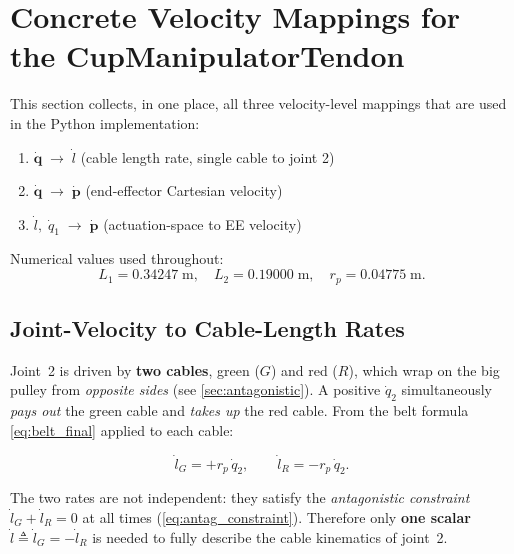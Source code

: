 \documentclass[12pt, a4paper]{article}
\theoremstyle{definition}
\newcommand{\bq}{\bm{q}}
\newcommand{\bp}{\bm{p}}
\begin{document}
\section{Concrete Velocity Mappings for the CupManipulatorTendon}
\label{sec:vel_mappings}

This section collects, in one place, all three velocity-level mappings that are
used in the Python implementation:
\begin{enumerate}
  \item $\dot{\bq} \;\to\; \dot{l}$ \quad (cable length rate, single cable to joint 2)
  \item $\dot{\bq} \;\to\; \dot{\bp}$ \quad (end-effector Cartesian velocity)
  \item $\dot{l},\;\dot{q}_1 \;\to\; \dot{\bp}$ \quad (actuation-space to EE velocity)
\end{enumerate}

Numerical values used throughout:
\[
  L_1 = 0.34247\;\text{m}, \quad
  L_2 = 0.19000\;\text{m}, \quad
  r_p = 0.04775\;\text{m}.
\]

\subsection{Joint-Velocity to Cable-Length Rates}
\label{sec:qdot2ldot}

Joint~2 is driven by \textbf{two cables}, green ($G$) and red ($R$), which wrap
on the big pulley from \emph{opposite sides} (see \cref{sec:antagonistic}).
A positive $\dot{q}_2$ simultaneously \emph{pays out} the green cable and
\emph{takes up} the red cable.  From the belt formula \cref{eq:belt_final}
applied to each cable:

\begin{equation}
  \label{eq:ldot_q}
  \boxed{
    \dot{l}_G = +r_p\,\dot{q}_2,
    \qquad
    \dot{l}_R = -r_p\,\dot{q}_2 .
  }
\end{equation}

The two rates are not independent: they satisfy the
\emph{antagonistic constraint} $\dot{l}_G + \dot{l}_R = 0$ at all times
(\cref{eq:antag_constraint}).  Therefore only \textbf{one scalar}
$\dot{l} \triangleq \dot{l}_G = -\dot{l}_R$ is needed to fully describe the
cable kinematics of joint~2.
\end{document}
